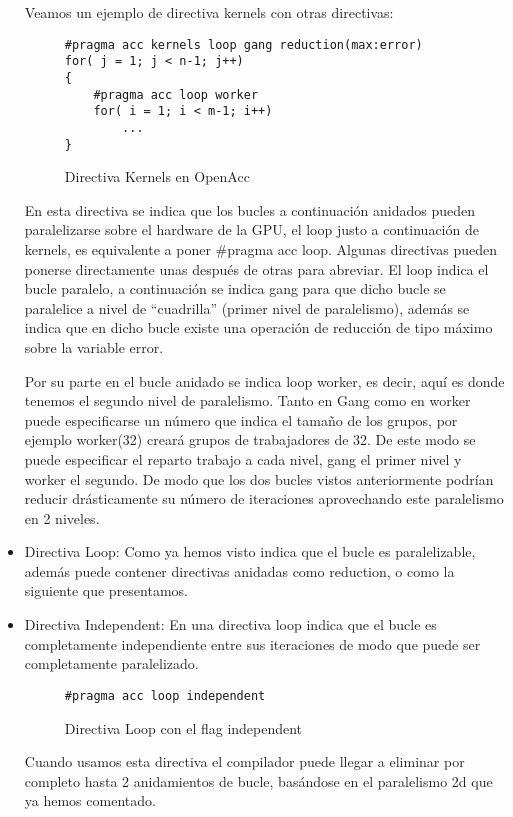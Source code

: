 \begin{itemize}
Veamos un ejemplo de directiva kernels con otras directivas:

\begin{figure}[t]
\begin{lstlisting}
#pragma acc kernels loop gang reduction(max:error)
for( j = 1; j < n-1; j++)
{
	#pragma acc loop worker
	for( i = 1; i < m-1; i++)
		...
}
\end{lstlisting}
\caption{Directiva Kernels en OpenAcc}
\label{FIG:KernelsOpenAcc}
\end{figure}

En esta directiva se indica que los bucles a continuación anidados pueden paralelizarse sobre el hardware de la GPU, el loop justo a continuación de kernels, es equivalente a poner \#pragma acc loop. Algunas directivas pueden ponerse directamente unas después de otras para abreviar. El loop indica el bucle paralelo, a continuación se indica gang para que dicho bucle se paralelice a nivel de “cuadrilla” (primer nivel de paralelismo), además se indica que en dicho bucle existe una operación de reducción de tipo máximo sobre la variable error.

Por su parte en el bucle anidado se indica loop worker, es decir, aquí es donde tenemos el segundo nivel de paralelismo.
Tanto en Gang como en worker puede especificarse un número que indica el tamaño de los grupos, por ejemplo worker(32) creará grupos de trabajadores de 32. De este modo se puede especificar el reparto trabajo a cada nivel, gang el primer nivel y worker el segundo.
De modo que los dos bucles vistos anteriormente podrían reducir drásticamente su número de iteraciones aprovechando este paralelismo en 2 niveles.

\item Directiva Loop: Como ya hemos visto indica que el bucle es paralelizable, además puede contener directivas anidadas como reduction, o como la siguiente que presentamos.

\item Directiva Independent: En una directiva loop indica que el bucle es completamente independiente entre sus iteraciones de modo que puede ser completamente paralelizado.

\begin{figure}[tph]
\begin{lstlisting}
#pragma acc loop independent
\end{lstlisting}
\caption{Directiva Loop con el flag independent}
\label{FIG:LoopIndependentOpenAcc}
\end{figure}

Cuando usamos esta directiva el compilador puede llegar a eliminar por completo hasta 2 anidamientos de bucle, basándose en el paralelismo 2d que ya hemos comentado.

\end{itemize}


